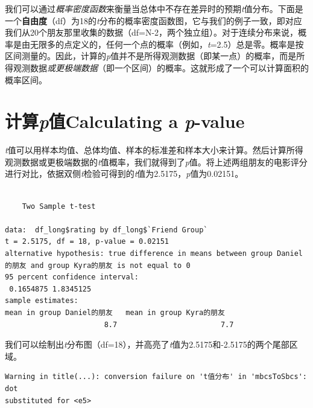 \documentclass[
  letterpaper,
  DIV=11,
  numbers=noendperiod]{scrreprt}
\newenvironment{Shaded}{\begin{snugshade}}{\end{snugshade}}
\newcommand{\AttributeTok}[1]{\textcolor[rgb]{0.40,0.45,0.13}{#1}}
\newcommand{\ConstantTok}[1]{\textcolor[rgb]{0.56,0.35,0.01}{#1}}
\newcommand{\FunctionTok}[1]{\textcolor[rgb]{0.28,0.35,0.67}{#1}}
\newcommand{\NormalTok}[1]{\textcolor[rgb]{0.00,0.23,0.31}{#1}}
\newcommand{\SpecialCharTok}[1]{\textcolor[rgb]{0.37,0.37,0.37}{#1}}
\newcommand{\StringTok}[1]{\textcolor[rgb]{0.13,0.47,0.30}{#1}}
\begin{document}
我们可以通过\emph{概率密度函数}来衡量当总体中不存在差异时的预期\emph{t}值分布。下面是一个\textbf{自由度}（df）为18的\emph{t}分布的概率密度函数图，它与我们的例子一致，即对应我们从20个朋友那里收集的数据（df=N-2，两个独立组）。对于连续分布来说，概率是由无限多的点定义的，任何一个点的概率（例如，\emph{t}=2.5）总是零。概率是按区间测量的。因此，计算的\emph{p}值并不是所得观测数据（即某一点）的概率，而是所得观测数据\emph{或更极端数据}（即一个区间）的概率。这就形成了一个可以计算面积的概率区间。

\hypertarget{ux8ba1ux7b97pux503ccalculating-a-p-value}{%
\section{\texorpdfstring{计算\emph{p}值Calculating a
\emph{p}-value}{计算p值Calculating a p-value}}\label{ux8ba1ux7b97pux503ccalculating-a-p-value}}

\emph{t}值可以用样本均值、总体均值、样本的标准差和样本大小来计算。然后计算所得观测数据或更极端数据的\emph{t}值概率，我们就得到了\emph{p}值。将上述两组朋友的电影评分进行对比，依据双侧\emph{t}检验可得到的\emph{t}值为2.5175，\emph{p}值为0.02151。

\begin{Shaded}
\end{Shaded}

\begin{verbatim}

    Two Sample t-test

data:  df_long$rating by df_long$`Friend Group`
t = 2.5175, df = 18, p-value = 0.02151
alternative hypothesis: true difference in means between group Daniel的朋友 and group Kyra的朋友 is not equal to 0
95 percent confidence interval:
 0.1654875 1.8345125
sample estimates:
mean in group Daniel的朋友   mean in group Kyra的朋友 
                       8.7                        7.7 
\end{verbatim}

我们可以绘制出\emph{t}分布图（df=18），并高亮了\emph{t}值为2.5175和-2.5175的两个尾部区域。

\begin{verbatim}
Warning in title(...): conversion failure on 't值分布' in 'mbcsToSbcs': dot
substituted for <e5>
\end{verbatim}
\end{document}
